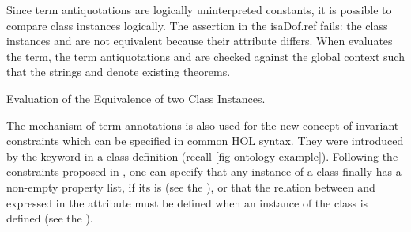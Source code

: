 \begin{isabellebody}
\begin{isamarkuptext}
Since term antiquotations are logically uninterpreted constants,
  it is possible to compare class instances logically. The assertion
  in the \csname isaDof.ref fails:
  the class instances  and  are not equivalent
  because their attribute  differs.
  When  evaluates the term,
  the term antiquotations  and  are checked
  against the global context such that the strings  and 
  denote existing theorems.
\end{isamarkuptext}\isamarkuptrue%

\begin{isamarkupfigure*}
[label = {term-context-equality-evaluation},type = {Isa_COL.figure}, args={label = {term-context-equality-evaluation},type = {Isa_COL.figure}, Isa_COL.figure.relative_width = {80}, Isa_COL.figure.src = {figures/term-context-equality-evaluation-example}, Isa_COL.figure.spawn_columns = {True}}]Evaluation of the Equivalence of two Class Instances.
\end{isamarkupfigure*}\isamarkuptrue%

\begin{isamarkuptext}
The mechanism of term annotations is also used for the new concept of 
  invariant constraints which can be specified in common HOL syntax.
  They were introduced by the keyword 
  in a class definition (recall \autoref{fig-ontology-example}).
  Following the constraints proposed in \cite{brucker.ea:isabelle-ontologies:2018}, 
  one can specify that any instance of a class 
  finally has a non-empty property list, if its  is 
  (see the ), or that 
  the relation between  and  expressed in the attribute 
  must be defined when an instance
  of the class  is defined (see the ).


\end{isamarkuptext}
\end{isabellebody}
